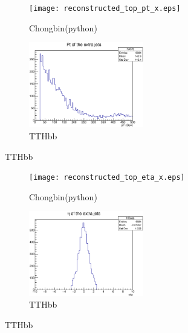 \documentclass{beamer}
\begin{document}
\begin{frame}
  \begin{figure}[!h]
  \captionsetup[subfigure]{labelformat=empty}
  \begin{subfigure}{.5\textwidth}
  \centering
  \texttt{[image: reconstructed\_top\_pt\_x.eps]}
  \caption{Chongbin(python)}
  \end{subfigure} \hfill
  \begin{subfigure}{.5\textwidth}
  \centering
  \includegraphics[width=5cm]{hXPt_alljetregion.eps}
  \caption{TTHbb}
  \end{subfigure}
  \end{figure}
\end{frame}

\begin{frame}
  \begin{figure}[!h]
  \captionsetup[subfigure]{labelformat=empty}
  \begin{subfigure}{.5\textwidth}
  \centering
  \texttt{[image: reconstructed\_top\_eta\_x.eps]}
  \caption{Chongbin(python)}
  \end{subfigure} \hfill
  \begin{subfigure}{.5\textwidth}
  \centering
  \includegraphics[width=5cm]{hXeta_alljetregion.eps}
  \caption{TTHbb}
  \end{subfigure}
  \end{figure}
\end{frame}
\end{document}
